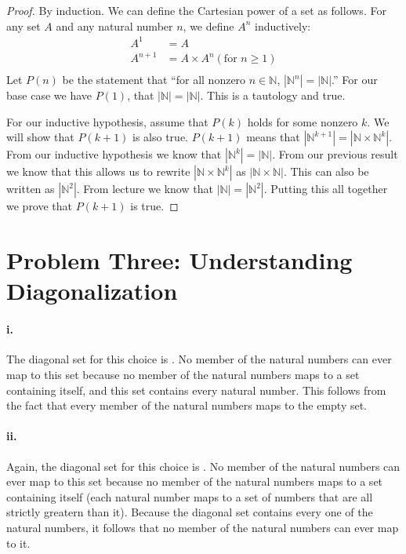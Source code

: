 \documentclass[10pt,letter]{article}
\begin{document}
\begin{proof} By induction. We can define the Cartesian power of a set as follows. For any set $A$ and any natural number $n$, we define $A^n$ inductively:
\begin{align*}
A^1 &= A \\
A^{n+1} &= A \times A^n (\text{for } n \ge 1)\\
\end{align*}
Let $P(n)$ be the statement that ``for all nonzero $n \in \mathbb{N}$, $|\mathbb{N}^n| = |\mathbb{N}|$.'' For our base case we have $P(1)$, that $|\mathbb{N}| = |\mathbb{N}|$. This is a tautology and true.

For our inductive hypothesis, assume that $P(k)$ holds for some nonzero $k$. We will show that $P(k+1)$ is also true. $P(k+1)$ means that $|\mathbb{N}^{k+1}| = |\mathbb{N} \times \mathbb{N}^k|$. From our inductive hypothesis we know that $|\mathbb{N}^k| = |\mathbb{N}|$. From our previous result we know that this allows us to rewrite $|\mathbb{N} \times \mathbb{N}^k|$ as $|\mathbb{N} \times \mathbb{N}|$. This can also be written as $|\mathbb{N}^2|$. From lecture we know that $|\mathbb{N}| = |\mathbb{N}^2|$. Putting this all together we prove that $P(k+1)$ is true.
\end{proof}


\section*{Problem Three: Understanding Diagonalization}

\paragraph{i.} The diagonal set for this choice is . No member of the natural numbers can ever map to this set because no member of the natural numbers maps to a set containing itself, and this set contains every natural number. This follows from the fact that every member of the natural numbers maps to the empty set.

\paragraph{ii.} Again, the diagonal set for this choice is . No member of the natural numbers can ever map to this set because no member of the natural numbers maps to a set containing itself (each natural number maps to a set of numbers that are all strictly greatern than it). Because the diagonal set contains every one of the natural numbers, it follows that no member of the natural numbers can ever map to it.
\end{document}
